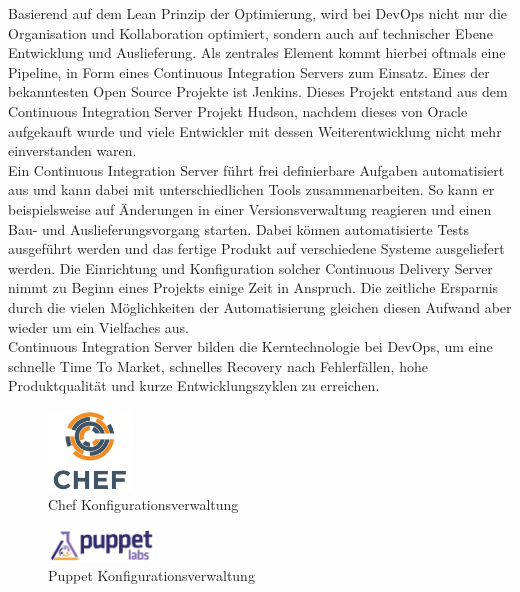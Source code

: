 Basierend auf dem Lean Prinzip der Optimierung, wird bei DevOps nicht nur die Organisation und Kollaboration optimiert, sondern auch auf technischer Ebene Entwicklung und Auslieferung. Als zentrales Element kommt hierbei oftmals eine Pipeline, in Form eines Continuous Integration Servers zum Einsatz. Eines der bekanntesten Open Source Projekte ist Jenkins. Dieses Projekt entstand aus dem Continuous Integration Server Projekt Hudson, nachdem dieses von Oracle aufgekauft wurde und viele Entwickler mit dessen Weiterentwicklung nicht mehr einverstanden waren. \parencite[Vgl.][S. 4]{smart:2011}\\
Ein Continuous Integration Server führt frei definierbare Aufgaben automatisiert aus und kann dabei mit unterschiedlichen Tools zusammenarbeiten. So kann er beispielsweise auf Änderungen in einer Versionsverwaltung reagieren und einen Bau- und Auslieferungsvorgang starten. Dabei können automatisierte Tests ausgeführt werden und das fertige Produkt auf verschiedene Systeme ausgeliefert werden. Die Einrichtung und Konfiguration solcher Continuous Delivery Server nimmt zu Beginn eines Projekts einige Zeit in Anspruch. Die zeitliche Ersparnis durch die vielen Möglichkeiten der Automatisierung gleichen diesen Aufwand aber wieder um ein Vielfaches aus. \parencite[Vgl.][S. 65 ff.]{smart:2011}\\
Continuous Integration Server bilden die Kerntechnologie bei DevOps, um eine schnelle Time To Market, schnelles Recovery nach Fehlerfällen, hohe Produktqualität und kurze Entwicklungszyklen zu erreichen.

\begin{figure}[ht]
  \centering
  \includegraphics[width=0.2\textwidth]{img/chef_logo.png}
  \caption{Chef Konfigurationsverwaltung \parencite[][]{Chef:2016}}
  \label{fig:scrummodell}
\end{figure}

\begin{figure}[ht]
  \centering
  \includegraphics[width=0.25\textwidth]{img/puppet_logo.png}
  \caption{Puppet Konfigurationsverwaltung \parencite[][]{Puppet:2016}}
  \label{fig:scrummodell}
\end{figure}

